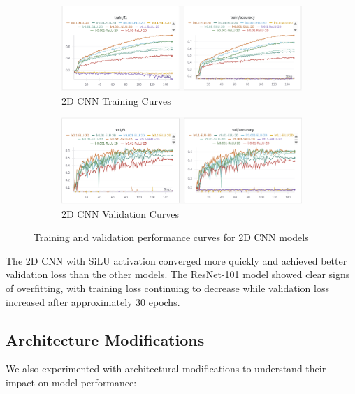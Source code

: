 \begin{figure}[h]
    \centering
    \begin{subfigure}[b]{0.48\textwidth}
        \includegraphics[width=\textwidth]{2D/2d-train.png}
        \caption{2D CNN Training Curves}
    \end{subfigure}
    \hfill
    \begin{subfigure}[b]{0.48\textwidth}
        \includegraphics[width=\textwidth]{2D/2d-val.png}
        \caption{2D CNN Validation Curves}
    \end{subfigure}
    \caption{Training and validation performance curves for 2D CNN models}
    \label{fig:2d_training_curves}
\end{figure}

The 2D CNN with SiLU activation converged more quickly and achieved better validation loss than the other models. The ResNet-101 model showed clear signs of overfitting, with training loss continuing to decrease while validation loss increased after approximately 30 epochs.

\subsection{Architecture Modifications}

We also experimented with architectural modifications to understand their impact on model performance:

